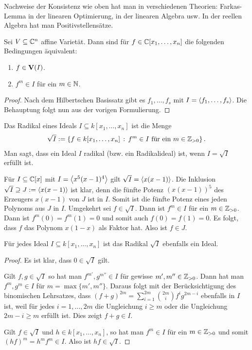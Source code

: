 \documentclass[11pt]{article}
\numberwithin{equation}{section}
\begin{document}
\begin{remark}
	Nachweise der Konsistenz wie oben hat man in verschiedenen Theorien: Farkas-Lemma in der linearen Optimierung, in der linearen Algebra usw. In der reellen Algebra hat man Positivstellensätze. 
\end{remark} 

\begin{theorem}
	Sei $V \subseteq \mathbb{C}^n$ affine Varietät. Dann sind für $f \in \mathbb{C}[x_1,\ldots,x_n]$ die folgenden Bedingungen äquivalent: 
	\begin{enumerate}
		\item $f  \in \mathbf{V}(I)$. 
		\item $f^m \in I$ für ein $m \in \mathbb{N}$. 
	\end{enumerate} 
\end{theorem}
\begin{proof}
	Nach dem Hilbertschen Basissatz gibt es  $f_1,\ldots,f_s$ mit $I = \left< f_1,\ldots,f_s \right>$. Die Behauptung folgt nun aus der vorigen Formulierung. 
\end{proof} 

\begin{definition}
	Das Radikal eines Ideals $I \subseteq k[x_1,\ldots,x_n]$ ist die Menge 
	\[
		\sqrt{I}:= \left\{ f \in k[x_1,\ldots,x_n] \,:\, f^m \in I \ \text{für ein} \ m \in \mathbb{Z}_{>0} \right\}.
	\] 
	Man sagt, dass ein Ideal $I$ radikal (bzw. ein Radikalideal) ist, wenn $I= \sqrt{I}$ erfüllt ist. 
\end{definition}  

\begin{beispiel}
	Für $I \subseteq \mathbb{C}[x]$ mit $I= \left< x^5 (x-1)^4 \right>$ gilt $\sqrt{I} = \left< x (x-1) \right>$.  Die Inklusion $\sqrt{I} \supseteq J:= \left<  x (x-1) \right>$ ist klar, denn die fünfte Potenz  $(x (x-1))^5$ des Erzeugers $x (x-1)$ von $J$ ist in $I$. Somit ist die fünfte Potenz eines jeden Polynoms aus $J$ in $I$. Umgekehrt sei $f \in \sqrt{I}$. Dann ist $f^m  \in I$ für ein $m \in \mathbb{Z}_{>0}$. Dann ist $f^m(0)= f^m(1) =0$ und somit auch $f(0)= f(1) =0$. Es folgt, dass $f$ das Polynom $x (1-x)$ als Faktor hat. Also ist $f \in J$. 
\end{beispiel}

\begin{proposition} 
	Für jedes Ideal $I \subseteq k[x_1,\ldots,x_n]$ ist das Radikal $\sqrt{I}$ ebenfalls ein Ideal. 
\end{proposition}
\begin{proof}
	Es ist klar, dass $0\in \sqrt{I}$ gilt. 
	
	Gilt $f,g \in \sqrt{I}$ so hat man $f^{m'}, g^{m''} \in I$ für gewisse $m',m'' \in \mathbb{Z}_{>0}$. Dann hat man $f^m , g^m \in I$ für $m = \max \{m', m''\}$. Daraus folgt mit der Berücksichtigung des binomischen Lehrsatzes, dass 
	$(f+g)^{2m}  = \sum_{i=1}^{2m} \binom{2m}{i} f^i g^{2m- i}$
	ebenfalls in $I$ ist, weil für jedes $i=1,\ldots, 2m$ die Ungleichung $i \ge m$ oder die Ungleichung $2m - i \ge m$ erfüllt ist. Dies zeigt $f+g \in I$. 
	
	Gilt $f \in \sqrt{I}$ und $h \in k[x_1,\ldots,x_n]$, so hat man $f^m \in I$ für ein $m \in \mathbb{Z}_{>0}$ und somit $(h f)^m = h^m f^m \in I$. Also ist $h f \in \sqrt{I}$. 
\end{proof} 
\end{document}
